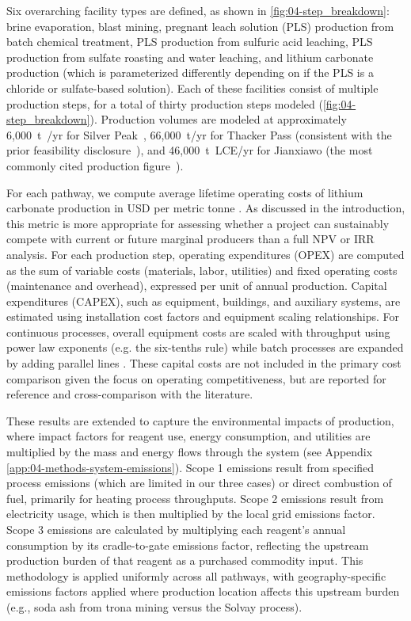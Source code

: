 Six overarching facility types are defined, as shown in \ref{fig:04-step_breakdown}: brine evaporation, blast mining, pregnant leach solution (PLS) production from batch chemical treatment, PLS production from sulfuric acid leaching, PLS production from sulfate roasting and water leaching, and lithium carbonate production (which is parameterized differently depending on if the PLS is a chloride or sulfate-based solution). Each of these facilities consist of multiple production steps, for a total of thirty production steps modeled (\ref{fig:04-step_breakdown}). Production volumes are modeled at approximately 6,000~t~/yr for Silver Peak~\cite{srkconsultingSECTechnicalReport2023a}, 66,000~t/yr for Thacker Pass (consistent with the prior feasibility disclosure~\cite{rothFeasibilityStudyNational2022}), and 46,000~t~LCE/yr for Jianxiawo (the most commonly cited production figure~\cite{flemingLongrunAvailabilityMineral2024, andrezejewskiResourcesEnergyQuarterly2025}).

For each pathway, we compute average lifetime operating costs of lithium carbonate production in USD per metric tonne . As discussed in the introduction, this metric is more appropriate for assessing whether a project can sustainably compete with current or future marginal producers than a full NPV or IRR analysis. For each production step, operating expenditures (OPEX) are computed as the sum of variable costs (materials, labor, utilities) and fixed operating costs (maintenance and overhead), expressed per unit of annual  production. Capital expenditures (CAPEX), such as equipment, buildings, and auxiliary systems, are estimated using installation cost factors and equipment scaling relationships. For continuous processes, overall equipment costs are scaled with throughput using power law exponents (e.g. the six-tenths rule) while batch processes are expanded by adding parallel lines \cite{petersPlantDesignEconomics1991, ausimmMonograph27Cost, ulrichGuideChemicalEngineering1984}. These capital costs are not included in the primary cost comparison given the focus on operating competitiveness, but are reported for reference and cross-comparison with the literature. 

These results are extended to capture the environmental impacts of production, where impact factors for reagent use, energy consumption, and utilities are multiplied by the mass and energy flows through the system (see Appendix \ref{app:04-methods-system-emissions}). Scope 1 emissions result from specified process emissions (which are limited in our three cases) or direct combustion of fuel, primarily for heating process throughputs. Scope 2 emissions result from electricity usage, which is then multiplied by the local grid emissions factor. Scope 3 emissions are calculated by multiplying each reagent's annual consumption by its cradle-to-gate emissions factor, reflecting the upstream production burden of that reagent as a purchased commodity input. This methodology is applied uniformly across all pathways, with geography-specific emissions factors applied where production location affects this upstream burden (e.g., soda ash from trona mining versus the Solvay process). 


